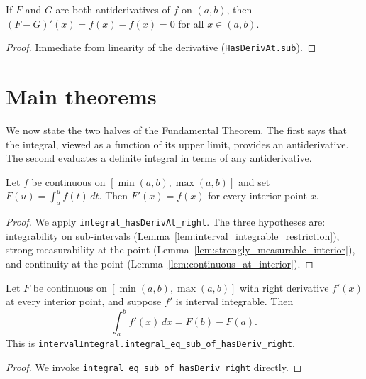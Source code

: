 \begin{lemma}
    \label{lem:antideriv_diff_zero_deriv}

    If $F$ and $G$ are both antiderivatives of $f$ on $(a,b)$, then $(F - G)'(x) = f(x) - f(x) = 0$ for all $x \in (a,b)$.
\end{lemma}
\begin{proof}
    Immediate from linearity of the derivative (\texttt{HasDerivAt.sub}).
\end{proof}

\section{Main theorems}

We now state the two halves of the Fundamental Theorem. The first says that the integral, viewed as a function of its upper limit, provides an antiderivative. The second evaluates a definite integral in terms of any antiderivative.

\begin{theorem}
    \label{thm:ftc1}

    Let $f$ be continuous on $[\min(a,b), \max(a,b)]$ and set $F(u) = \int_a^u f(t)\,dt$. Then $F'(x) = f(x)$ for every interior point $x$.
\end{theorem}
\begin{proof}
    We apply \texttt{integral\_hasDerivAt\_right}. The three hypotheses are: integrability on sub-intervals (Lemma~\ref{lem:interval_integrable_restriction}), strong measurability at the point (Lemma~\ref{lem:strongly_measurable_interior}), and continuity at the point (Lemma~\ref{lem:continuous_at_interior}).
\end{proof}

\begin{theorem}
    \label{thm:ftc2}

    Let $F$ be continuous on $[\min(a,b), \max(a,b)]$ with right derivative $f'(x)$ at every interior point, and suppose $f'$ is interval integrable. Then
    \[
      \int_a^b f'(x)\,dx = F(b) - F(a).
    \]
    This is \texttt{intervalIntegral.integral\_eq\_sub\_of\_hasDeriv\_right}.
\end{theorem}
\begin{proof}
    We invoke \texttt{integral\_eq\_sub\_of\_hasDeriv\_right} directly.
\end{proof}

